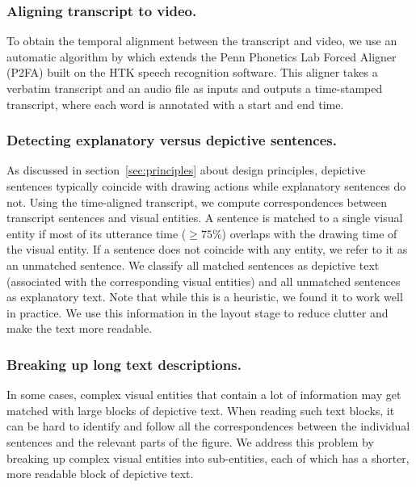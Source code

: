 \subsubsection{Aligning transcript to video.} 
To obtain the temporal alignment between the transcript and video, we use an automatic algorithm by \cite{rubin2013content} which extends the Penn Phonetics Lab Forced Aligner (P2FA) built on the HTK speech recognition software. This   aligner takes a verbatim transcript and an audio file as inputs and outputs a time-stamped transcript, where each word is annotated with a start and end time. 

\subsubsection{Detecting explanatory versus depictive sentences.} 
As discussed in section~\ref{sec:principles} about design principles, depictive sentences typically coincide with drawing actions while explanatory sentences do not. Using the time-aligned transcript,
we compute correspondences between transcript sentences and visual entities.
A sentence is matched to a single visual entity if most of its utterance
time ($ \geq 75\% $) overlaps with the drawing time of the visual entity.
If a sentence does not coincide with any entity, we refer to it as an unmatched
sentence. We classify all matched sentences as depictive text (associated with the corresponding visual entities) and all unmatched sentences as explanatory text.
%
Note that while this is a heuristic, we found it to work well in practice. 
%
We use this information in the layout stage to reduce clutter and make the text more readable.    

\subsubsection{Breaking up long text descriptions.}
%
In some cases, complex visual entities that contain a lot of information may get matched with large blocks of depictive text.
%
When reading such text blocks, it can be hard to identify and follow all the correspondences between the individual sentences and the relevant parts of the figure.
%
We address this problem by breaking up complex visual entities into sub-entities, each of which has a shorter, more readable block of depictive text.\\

